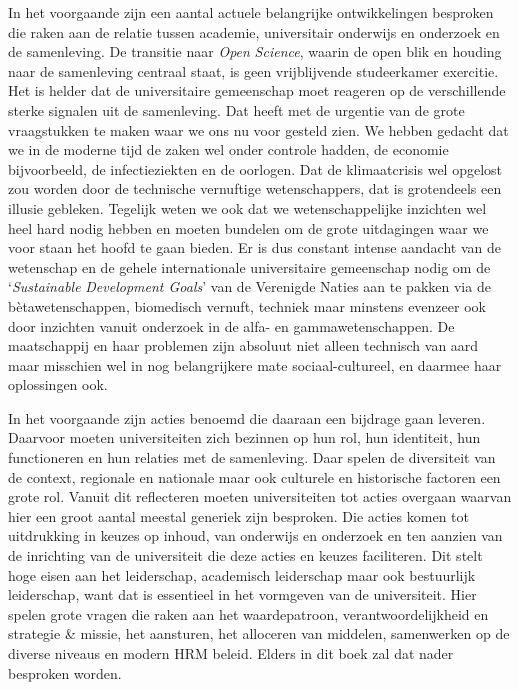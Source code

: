 \documentclass[smallauthor, chapterhaspagenum, nochapterinheader, pagenuminheader,  bigchapnum,medium2, tocpages,  garamond, titleinheader]{jote-book}
\begin{document}
	In het voorgaande zijn een aantal actuele belangrijke ontwikkelingen besproken die raken aan de relatie tussen academie, universitair onderwijs en onderzoek en de samenleving. De transitie naar \emph{Open }\emph{Science}, waarin de open blik en houding naar de samenleving centraal staat, is geen vrijblijvende studeerkamer exercitie. Het is helder dat de universitaire gemeenschap moet reageren op de verschillende sterke signalen uit de samenleving. Dat heeft met de urgentie van de grote vraagstukken te maken waar we ons nu voor gesteld zien. We hebben gedacht dat we in de moderne tijd de zaken wel onder controle hadden, de economie bijvoorbeeld, de infectieziekten en de oorlogen. Dat de klimaatcrisis wel opgelost zou worden door de technische vernuftige wetenschappers, dat is grotendeels een illusie gebleken. Tegelijk weten we ook dat we wetenschappelijke inzichten wel heel hard nodig hebben en moeten bundelen om de grote uitdagingen waar we voor staan het hoofd te gaan bieden. Er is dus constant intense aandacht van de wetenschap en de gehele internationale universitaire gemeenschap nodig om de ‘\emph{Sustainable}\emph{ Development Goals}' van de Verenigde Naties aan te pakken via de bètawetenschappen, biomedisch vernuft, techniek maar minstens evenzeer ook door inzichten vanuit onderzoek in de alfa- en gammawetenschappen. De maatschappij en haar problemen zijn absoluut niet alleen technisch van aard maar misschien wel in nog belangrijkere mate sociaal-cultureel, en daarmee haar oplossingen ook.



	In het voorgaande zijn acties benoemd die daaraan een bijdrage gaan leveren. Daarvoor moeten universiteiten zich bezinnen op hun rol, hun identiteit, hun functioneren en hun relaties met de samenleving. Daar spelen de diversiteit van de context, regionale en nationale maar ook culturele en historische factoren een grote rol. Vanuit dit reflecteren moeten universiteiten tot acties overgaan waarvan hier een groot aantal meestal generiek zijn besproken. Die acties komen tot uitdrukking in keuzes op inhoud, van onderwijs en onderzoek en ten aanzien van de inrichting van de universiteit die deze acties en keuzes faciliteren. Dit stelt hoge eisen aan het leiderschap, academisch leiderschap maar ook bestuurlijk leiderschap, want dat is essentieel in het vormgeven van de universiteit. Hier spelen grote vragen die raken aan het waardepatroon, verantwoordelijkheid en strategie \& missie, het aansturen, het alloceren van middelen, samenwerken op de diverse niveaus en modern HRM beleid. Elders in dit boek zal dat nader besproken worden.
\end{document}

